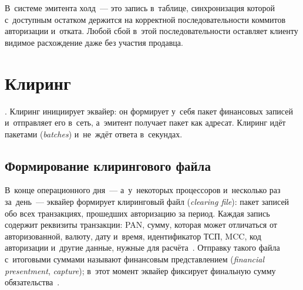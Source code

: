 В~системе эмитента холд~--- это запись в~таблице, синхронизация
которой с~доступным остатком держится на корректной последовательности коммитов
авторизации и~отката. Любой сбой в~этой последовательности оставляет клиенту
видимое расхождение даже без участия продавца.


\section{Клиринг}\label{sec:tx-clearing}

. Клиринг
инициирует эквайер: он формирует у~себя пакет финансовых записей и~отправляет
его в~сеть, а~эмитент получает пакет как адресат. Клиринг идёт пакетами
(\textit{batches}) и~не~ждёт ответа в~секундах.

\subsection*{Формирование клирингового файла}

В~конце операционного дня~--- а~у~некоторых процессоров и~несколько раз
за~день~--- эквайер формирует клиринговый файл (\textit{clearing file}): пакет
записей обо всех транзакциях, прошедших авторизацию за период. Каждая запись
содержит реквизиты транзакции: PAN, сумму, которая может отличаться от
авторизованной, валюту, дату и~время, идентификатор ТСП, MCC, код авторизации
и~другие данные, нужные для расчёта~\cite{mc-rules}. Отправку такого файла
с~итоговыми суммами называют финансовым представлением (\textit{financial
presentment}, \textit{capture}); в~этот момент эквайер фиксирует
финальную сумму обязательства~\cite{visa-tadg,mc-tpr}.

